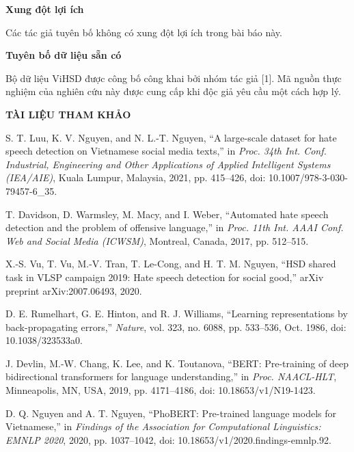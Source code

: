 \documentclass[11pt,a4paper]{article}
\newcommand{\secvn}[1]{\vspace{6pt}\noindent\textbf{#1}\vspace{6pt}\par\nopagebreak}
\begin{document}
\secvn{Xung đột lợi ích}

\noindent Các tác giả tuyên bố không có xung đột lợi ích trong bài báo này.

\secvn{Tuyên bố dữ liệu sẵn có}

\noindent Bộ dữ liệu ViHSD được công bố công khai bởi nhóm tác giả [1]. Mã nguồn thực nghiệm của nghiên cứu này được cung cấp khi độc giả yêu cầu một cách hợp lý.

\secvn{TÀI LIỆU THAM KHẢO}

{\fontsize{8}{10}\selectfont
\setlength{\parindent}{0cm}
\newenvironment{refitem}{\par\hangindent=0.75cm\noindent}{}

\begin{refitem}[1] S. T. Luu, K. V. Nguyen, and N. L.-T. Nguyen, ``A large-scale dataset for hate speech detection on Vietnamese social media texts,'' in \textit{Proc. 34th Int. Conf. Industrial, Engineering and Other Applications of Applied Intelligent Systems (IEA/AIE)}, Kuala Lumpur, Malaysia, 2021, pp. 415--426, doi: 10.1007/978-3-030-79457-6\_35.\end{refitem}
\begin{refitem}[2] T. Davidson, D. Warmsley, M. Macy, and I. Weber, ``Automated hate speech detection and the problem of offensive language,'' in \textit{Proc. 11th Int. AAAI Conf. Web and Social Media (ICWSM)}, Montreal, Canada, 2017, pp. 512--515.\end{refitem}
\begin{refitem}[3] X.-S. Vu, T. Vu, M.-V. Tran, T. Le-Cong, and H. T. M. Nguyen, ``HSD shared task in VLSP campaign 2019: Hate speech detection for social good,'' arXiv preprint arXiv:2007.06493, 2020.\end{refitem}
\begin{refitem}[4] D. E. Rumelhart, G. E. Hinton, and R. J. Williams, ``Learning representations by back-propagating errors,'' \textit{Nature}, vol. 323, no. 6088, pp. 533--536, Oct. 1986, doi: 10.1038/323533a0.\end{refitem}
\begin{refitem}[5] J. Devlin, M.-W. Chang, K. Lee, and K. Toutanova, ``BERT: Pre-training of deep bidirectional transformers for language understanding,'' in \textit{Proc. NAACL-HLT}, Minneapolis, MN, USA, 2019, pp. 4171--4186, doi: 10.18653/v1/N19-1423.\end{refitem}
\begin{refitem}[6] D. Q. Nguyen and A. T. Nguyen, ``PhoBERT: Pre-trained language models for Vietnamese,'' in \textit{Findings of the Association for Computational Linguistics: EMNLP 2020}, 2020, pp. 1037--1042, doi: 10.18653/v1/2020.findings-emnlp.92.\end{refitem}
}
\end{document}
